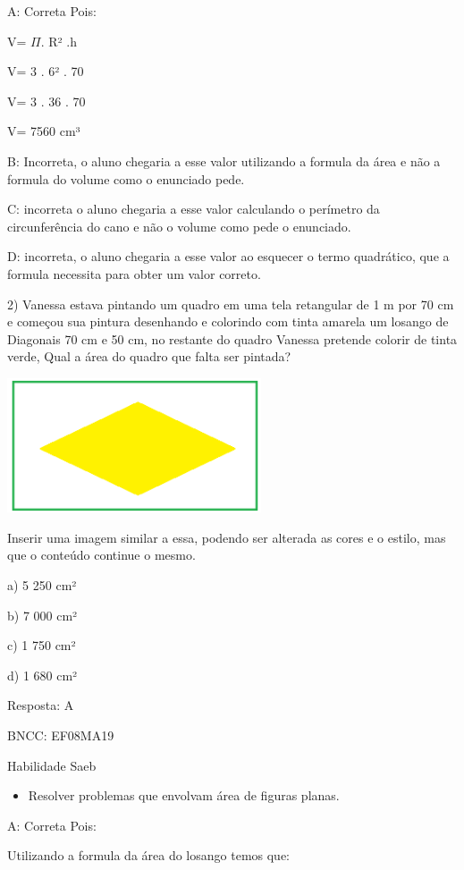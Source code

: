 {A: Correta Pois:

V= \(\Pi\). R² .h

V= 3 . 6² . 70

V= 3 . 36 . 70

V= 7560 cm³

B: Incorreta, o aluno chegaria a esse valor utilizando a formula da área
e não a formula do volume como o enunciado pede.

C: incorreta o aluno chegaria a esse valor calculando o perímetro da
circunferência do cano e não o volume como pede o enunciado.

D: incorreta, o aluno chegaria a esse valor ao esquecer o termo
quadrático, que a formula necessita para obter um valor correto.

2) Vanessa estava pintando um quadro em uma tela retangular de 1 m por
70 cm e começou sua pintura desenhando e colorindo com tinta amarela um
losango de Diagonais 70 cm e 50 cm, no restante do quadro Vanessa
pretende colorir de tinta verde, Qual a área do quadro que falta ser
pintada?

\includegraphics[width=2.95833in,height=1.56526in]{./imgSAEB_8_MAT/media/image54.png}

Inserir uma imagem similar a essa, podendo ser alterada as cores e o
estilo, mas que o conteúdo continue o mesmo.

a) 5 250 cm²

b) 7 000 cm²

c) 1 750 cm²

d) 1 680 cm²

Resposta: A

BNCC: EF08MA19

Habilidade Saeb

\begin{itemize}
\tightlist
\item
  Resolver problemas que envolvam área de figuras planas.
\end{itemize}

A: Correta Pois:

Utilizando a formula da área do losango temos que:

}
